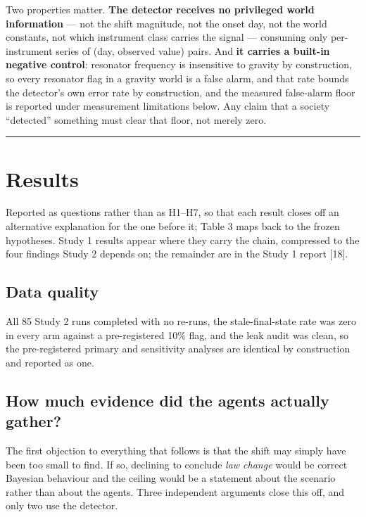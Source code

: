 \documentclass[pdflatex,sn-basic]{sn-jnl}
\begin{document}
Two properties matter. \textbf{The detector receives no privileged world information} --- not the
shift magnitude, not the onset day, not the world constants, not which instrument class
carries the signal --- consuming only per-instrument series of (day, observed value) pairs.
And \textbf{it carries a built-in negative control}: resonator frequency is insensitive to
gravity by construction, so every resonator flag in a gravity world is a false alarm, and
that rate bounds the detector's own error rate by construction, and the measured
false-alarm floor is reported under measurement limitations below. Any claim that a society
``detected'' something must clear that floor, not merely zero.

\begin{center}\rule{0.5\linewidth}{0.5pt}\end{center}

\hypertarget{results}{%
\section{Results}\label{results}}

Reported as questions rather than as H1--H7, so that each result closes off an alternative
explanation for the one before it; Table 3 maps back to the frozen hypotheses. Study 1
results appear where they carry the chain, compressed to the four findings Study 2 depends
on; the remainder are in the Study 1 report {[}18{]}.

\hypertarget{data-quality}{%
\subsection{Data quality}\label{data-quality}}

All 85 Study 2 runs completed with no re-runs, the stale-final-state
rate was zero in every arm against a pre-registered 10\% flag, and the leak audit was
clean, so the pre-registered primary and sensitivity analyses are identical by
construction and reported as one.

\hypertarget{how-much-evidence-did-the-agents-actually-gather}{%
\subsection{How much evidence did the agents actually gather?}\label{how-much-evidence-did-the-agents-actually-gather}}

The first objection to everything that follows is that the shift may simply have been too small
to find. If so, declining to conclude \emph{law change} would be correct Bayesian behaviour and the
ceiling would be a statement about the scenario rather than about the agents. Three independent
arguments close this off, and only two use the detector.
\end{document}
